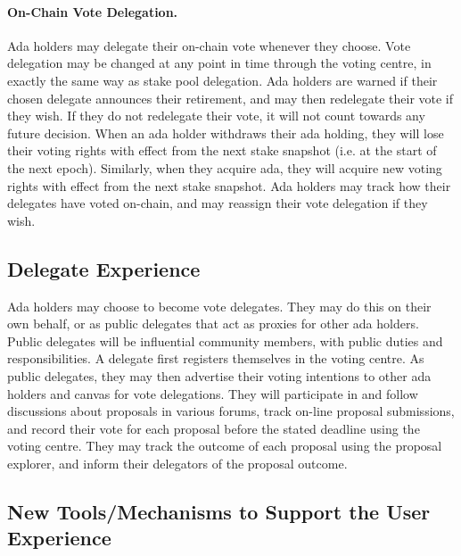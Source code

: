 \paragraph{On-Chain Vote Delegation.}

Ada holders may delegate their on-chain vote whenever they choose.  Vote delegation may be changed at any point in time through the voting centre, in
exactly the same way as stake pool delegation.  Ada holders are warned if their chosen delegate announces their retirement, and may then redelegate their vote if they
wish.  If they do not redelegate their vote, it will not count towards any future decision. %
When an ada holder withdraws their ada holding, they will lose their voting rights with effect from the next stake snapshot (i.e. at the start of the next
epoch).  Similarly, when they acquire ada, they will acquire new voting rights with effect from the next stake snapshot.
Ada holders may track how their delegates have voted on-chain, and may reassign their vote delegation if they wish.

\subsection{Delegate Experience}

Ada holders may choose to become vote delegates.  They may do this on their own behalf, or as public delegates that act as proxies for other ada holders.
Public delegates will be influential community members, with public duties and responsibilities.
A delegate first registers themselves in the voting centre.  As public delegates, they may then advertise their voting intentions to other ada holders and canvas for vote delegations.
They will participate in and follow discussions about proposals in various forums, track on-line proposal submissions, and
record their vote for each proposal before the stated deadline using the voting centre.  They may track the outcome of each proposal using the proposal explorer, and inform their
delegators of the proposal outcome.

\subsection{New Tools/Mechanisms to Support the User Experience}

